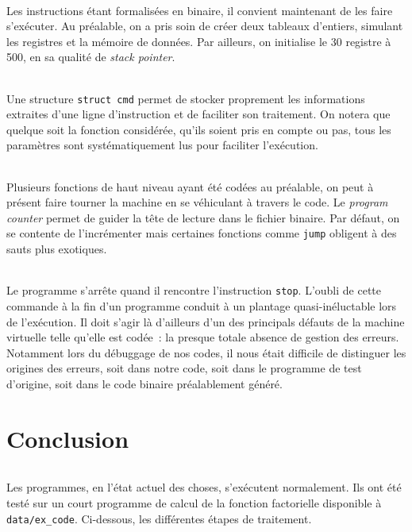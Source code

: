 \documentclass[11pt]{article}
\begin{document}
	\paragraph{}
	Les instructions étant formalisées en binaire, il convient maintenant de les faire s'exécuter. Au préalable, on a pris soin de créer deux tableaux d'entiers, simulant les registres et la mémoire de données. Par ailleurs, on initialise le 30 registre à 500, en sa qualité de \textit{stack pointer}.

	\paragraph{}
	Une structure \verb?struct cmd? permet de stocker proprement les informations extraites d'une ligne d'instruction et de faciliter son traitement. On notera que quelque soit la fonction considérée, qu'ils soient pris en compte ou pas, tous les paramètres sont systématiquement lus pour faciliter l'exécution.

	\paragraph{}
	Plusieurs fonctions de haut niveau ayant été codées au préalable, on peut à présent faire tourner la machine en se véhiculant à travers le code. Le \textit{program counter} permet de guider la tête de lecture dans le fichier binaire. Par défaut, on se contente de l'incrémenter mais certaines fonctions comme \verb?jump? obligent à des sauts plus exotiques.

	\paragraph{}
	Le programme s'arrête quand il rencontre l'instruction \verb?stop?. L'oubli de cette commande à la fin d'un programme conduit à un plantage quasi-inéluctable lors de l'exécution. Il doit s'agir là d'ailleurs d'un des principals défauts de la machine virtuelle telle qu'elle est codée~: la presque totale absence de gestion des erreurs. Notamment lors du débuggage de nos codes, il nous était difficile de distinguer les origines des erreurs, soit dans notre code, soit dans le programme de test d'origine, soit dans le code binaire préalablement généré.

	\part*{Conclusion}
	\paragraph{}
	Les programmes, en l'état actuel des choses, s'exécutent normalement. Ils ont été testé sur un court programme de calcul de la fonction factorielle disponible à \verb,data/ex_code,. Ci-dessous, les différentes étapes de traitement.
\end{document}
